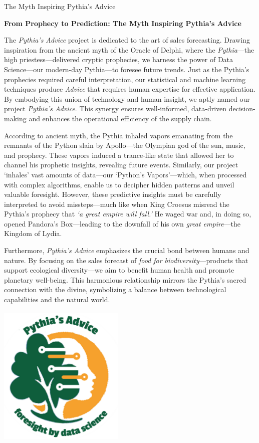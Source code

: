 \documentclass[
  american,
  10,
  a4paper,
]{book}
\theoremstyle{definition}
\theoremstyle{remark}
\begin{document}
The Myth Inspiring Pythia's Advice

\hfill\break

\textbf{\hfill\break
From Prophecy to Prediction: The Myth Inspiring Pythia's Advice}

The \emph{Pythia's Advice} project is dedicated to the art of sales
forecasting. Drawing inspiration from the ancient myth of the Oracle of
Delphi, where the \emph{Pythia}---the high priestess---delivered cryptic
prophecies, we harness the power of Data Science---our modern-day
Pythia---to foresee future trends. Just as the Pythia's prophecies
required careful interpretation, our statistical and machine learning
techniques produce \emph{Advice} that requires human expertise for
effective application. By embodying this union of technology and human
insight, we aptly named our project \emph{Pythia's Advice}. This synergy
ensures well-informed, data-driven decision-making and enhances the
operational efficiency of the supply chain.

According to ancient myth, the Pythia inhaled vapors emanating from the
remnants of the Python slain by Apollo---the Olympian god of the sun,
music, and prophecy. These vapors induced a trance-like state that
allowed her to channel his prophetic insights, revealing future events.
Similarly, our project `inhales' vast amounts of data---our `Python's
Vapors'---which, when processed with complex algorithms, enable us to
decipher hidden patterns and unveil valuable foresight. However, these
predictive insights must be carefully interpreted to avoid
missteps---much like when King Croesus misread the Pythia's prophecy
that \emph{`a great empire will fall.'} He waged war and, in doing so,
opened Pandora's Box---leading to the downfall of his own \emph{great
empire}---the Kingdom of Lydia.

Furthermore, \emph{Pythia's Advice} emphasizes the crucial bond between
humans and nature. By focusing on the sales forecast of \emph{food for
biodiversity}---products that support ecological diversity---we aim to
benefit human health and promote planetary well-being. This harmonious
relationship mirrors the Pythia's sacred connection with the divine,
symbolizing a balance between technological capabilities and the natural
world.

\hfill\break

\begin{center}
\includegraphics[width=6cm,height=6.8cm]{images/pythia_logo.png}
\end{center}
\end{document}
